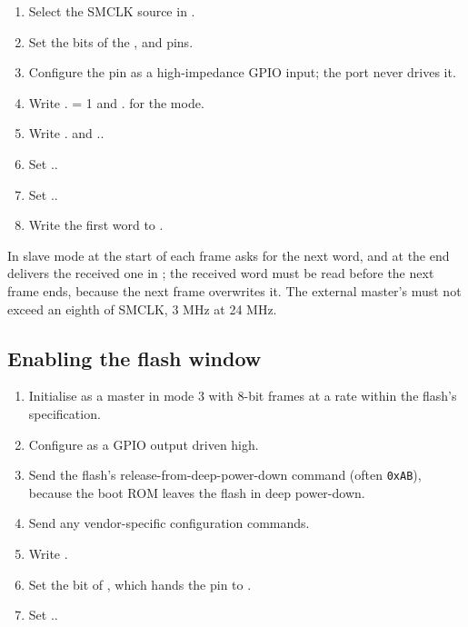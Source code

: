 \begin{enumerate}
	\item Select the SMCLK source in .
	\item Set the  bits of the ,  and  pins.
	\item Configure the  pin as a high-impedance GPIO input; the port never drives it.
	\item Write . = 1 and . for the mode.
	\item Write . and ..
	\item Set ..
	\item Set ..
	\item Write the first word to .
\end{enumerate}

In slave mode  at the start of each frame asks for the next word, and  at the end delivers the received one in ; the received word must be read before the next frame ends, because the next frame overwrites it. The external master's  must not exceed an eighth of SMCLK, 3 MHz at 24 MHz.

\subsection{Enabling the flash window}

\begin{enumerate}
	\item Initialise  as a master in mode 3 with 8-bit frames at a rate within the flash's specification.
	\item Configure  as a GPIO output driven high.
	\item Send the flash's release-from-deep-power-down command (often \texttt{0xAB}), because the boot ROM leaves the flash in deep power-down.
	\item Send any vendor-specific configuration commands.
	\item Write .
	\item Set the  bit of , which hands the pin to .
	\item Set ..
\end{enumerate}

